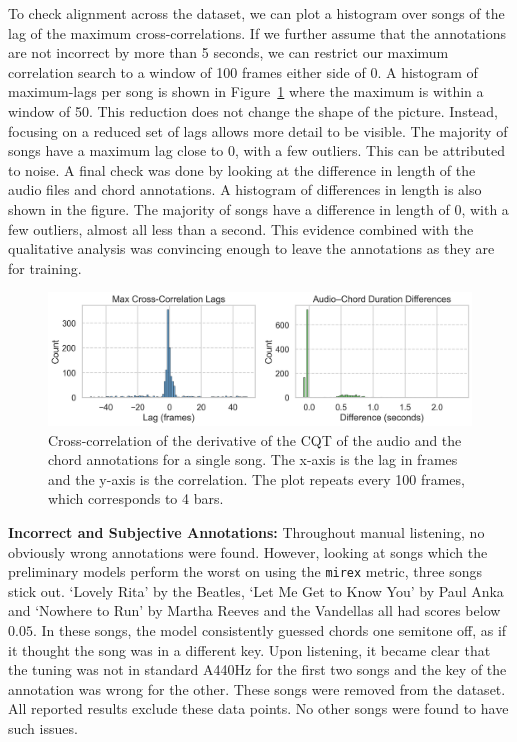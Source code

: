 To check alignment across the dataset, we can plot a histogram over songs of the lag of the maximum cross-correlations. If we further assume that the annotations are not incorrect by more than 5 seconds, we can restrict our maximum correlation search to a window of 100 frames either side of 0. A histogram of maximum-lags per song is shown in Figure~\ref{fig:durations-and-lags} where the maximum is within a window of 50. This reduction does not change the shape of the picture. Instead, focusing on a reduced set of lags allows more detail to be visible. The majority of songs have a maximum lag close to 0, with a few outliers. This can be attributed to noise. A final check was done by looking at the difference in length of the audio files and chord annotations. A histogram of differences in length is also shown in the figure. The majority of songs have a difference in length of 0, with a few outliers, almost all less than a second. This evidence combined with the qualitative analysis was convincing enough to leave the annotations as they are for training.

\begin{figure}[H]
    \centering
    \includegraphics[width=1.0\textwidth]{figures/duration_diffs_and_lags.png}
    \caption{Cross-correlation of the derivative of the CQT of the audio and the chord annotations for a single song. The x-axis is the lag in frames and the y-axis is the correlation. The plot repeats every 100 frames, which corresponds to 4 bars.}\label{fig:durations-and-lags}
\end{figure}

\textbf{Incorrect and Subjective Annotations:} Throughout manual listening, no obviously wrong annotations were found. However, looking at songs which the preliminary models perform the worst on using the \texttt{mirex} metric, three songs stick out. `Lovely Rita' by the Beatles, `Let Me Get to Know You' by Paul Anka and `Nowhere to Run' by Martha Reeves and the Vandellas all had scores below $0.05$. In these songs, the model consistently guessed chords one semitone off, as if it thought the song was in a different key. Upon listening, it became clear that the tuning was not in standard A440Hz for the first two songs and the key of the annotation was wrong for the other. These songs were removed from the dataset. All reported results exclude these data points. No other songs were found to have such issues.


